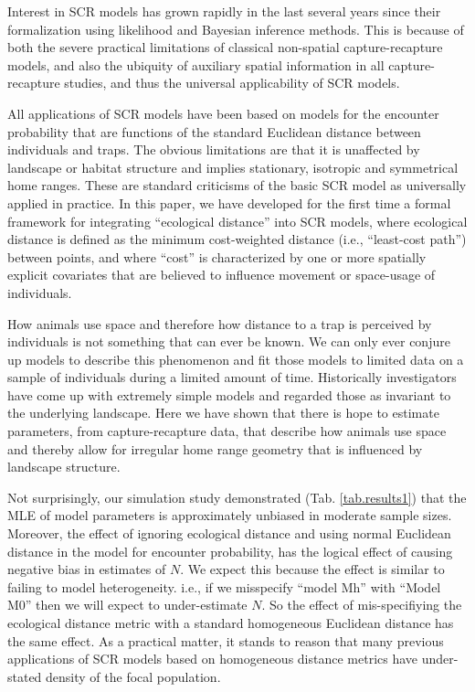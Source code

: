 \documentclass[12pt]{article}
\begin{document}
Interest in SCR models has grown rapidly in the last several years
since their formalization using likelihood \citep{borchers_efford:2008}
and Bayesian \citep{royle_young:2008} inference methods. This is because
of both the severe practical limitations of classical non-spatial
capture-recapture models, and also the ubiquity of auxiliary spatial
information in all capture-recapture studies, and thus the universal
applicability of SCR models.

All applications of SCR models have been based on models for the
encounter probability that are functions of
the standard Euclidean distance between
individuals and traps. The obvious limitations are that it is
unaffected by landscape or habitat structure and implies
stationary,  isotropic and symmetrical home ranges. These are standard
criticisms of the basic SCR model as universally applied in practice.
In this paper,  we have developed for the first time a formal framework
for integrating
``ecological distance'' into SCR models, where ecological distance is
defined as the minimum cost-weighted distance (i.e., ``least-cost path'') between points, and where ``cost''
is characterized by one or more spatially explicit covariates that are
believed to influence movement or space-usage of individuals.

How animals use space and therefore how distance to a trap is
perceived by individuals is not something that can ever be known. We
can only ever conjure up models to describe this
phenomenon and fit those models to limited data on a sample of individuals
during a limited amount of time.
Historically investigators have come up with extremely simple
models and regarded those as invariant to
the underlying landscape. Here we have shown that there is hope to
estimate parameters, from capture-recapture data,
 that describe how animals use space and thereby
allow for irregular home range geometry that is influenced by
landscape structure.

Not surprisingly, our simulation study demonstrated 
(Tab. \ref{tab.results1})
that the MLE of model
parameters is approximately unbiased in moderate sample
sizes. Moreover, the
effect of ignoring ecological distance and using normal Euclidean
distance in the model for encounter probability, has the
logical effect of causing negative bias
in estimates of $N$. 
We expect this because the effect is similar to
failing to model heterogeneity. i.e., if we misspecify ``model Mh'' \citep{otis_etal:1978} with
``Model M0'' \citep{otis_etal:1978} then we will expect to under-estimate $N$. So the effect of
mis-specifiying the ecological distance metric with a standard
homogeneous Euclidean distance has the same effect. As a practical matter,
it stands to reason that many previous applications of SCR models based
on homogeneous distance metrics have under-stated density of the focal
population.
\end{document}
